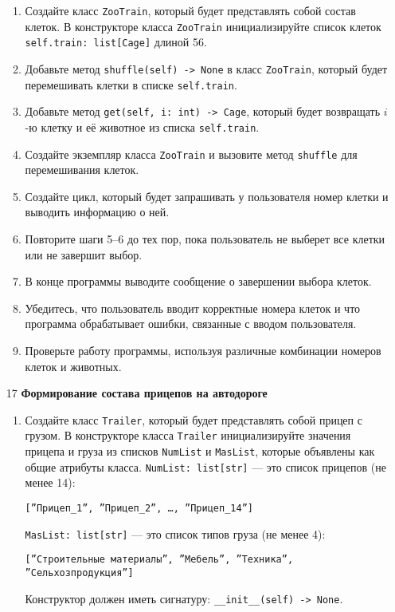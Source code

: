 \begin{enumerate}
\begin{enumerate}
    \item Создайте класс \texttt{ZooTrain}, который будет представлять собой состав клеток. В конструкторе класса \texttt{ZooTrain} инициализируйте список клеток \texttt{self.train: list[Cage]} длиной 56.

    \item Добавьте метод \texttt{shuffle(self) -> None} в класс \texttt{ZooTrain}, который будет перемешивать клетки в списке \texttt{self.train}.

    \item Добавьте метод \texttt{get(self, i: int) -> Cage}, который будет возвращать $i$-ю клетку и её животное из списка \texttt{self.train}.

    \item Создайте экземпляр класса \texttt{ZooTrain} и вызовите метод \texttt{shuffle} для перемешивания клеток.

    \item Создайте цикл, который будет запрашивать у пользователя номер клетки и выводить информацию о ней.

    \item Повторите шаги 5–6 до тех пор, пока пользователь не выберет все клетки или не завершит выбор.

    \item В конце программы выводите сообщение о завершении выбора клеток.

    \item Убедитесь, что пользователь вводит корректные номера клеток и что программа обрабатывает ошибки, связанные с вводом пользователя.

    \item Проверьте работу программы, используя различные комбинации номеров клеток и животных.
\end{enumerate}

\item[17] \textbf{Формирование состава прицепов на автодороге}
\begin{enumerate}
    \item Создайте класс \texttt{Trailer}, который будет представлять собой прицеп с грузом. В конструкторе класса \texttt{Trailer} инициализируйте значения прицепа и груза из списков \texttt{NumList} и \texttt{MasList}, которые объявлены как общие атрибуты класса. \texttt{NumList: list[str]} — это список прицепов (не менее 14): 
    \begin{center}
        \texttt{[''Прицеп\_1'', ''Прицеп\_2'', \dots, ''Прицеп\_14'']}
    \end{center}
    \texttt{MasList: list[str]} — это список типов груза (не менее 4):
    \begin{center}
        \texttt{[''Строительные материалы'', ''Мебель'', ''Техника'', ''Сельхозпродукция'']}
    \end{center}
    Конструктор должен иметь сигнатуру: \texttt{\_\_init\_\_(self) -> None}.


\end{enumerate}
\end{enumerate}
